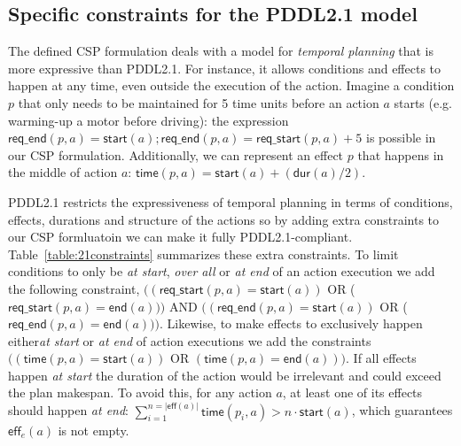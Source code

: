 \documentclass{ecai}
\newcommand{\eff}{\mathsf{eff}}    %
\newcommand{\dur}{\mathsf{dur}}    %
\newcommand{\start}{\mathsf{start}}%
\newcommand{\en}{\mathsf{end}}     %
\newcommand{\tim}{\mathsf{time}}   %
\newcommand{\reqs}{\mathsf{req\_{start}}} %
\newcommand{\reqe}{\mathsf{req\_{end}}}   %
\begin{document}
\subsection{Specific constraints for the PDDL2.1 model}
\label{sec:PDDL21constraints}
The defined CSP formulation deals with a model for {\em temporal planning} that is more expressive than PDDL2.1. For instance, it allows conditions and effects to happen at any time, even outside the execution of the action. Imagine a condition $p$ that only needs to be maintained for 5 time units before an action $a$ starts (e.g. warming-up a motor before driving): the expression $\reqe(p,a)=\start(a); \reqe(p,a) = \reqs(p,a)+5$ is possible in our CSP formulation. Additionally, we can represent an effect $p$ that happens in the middle of action $a$: $\tim(p,a) = \start(a)+ (\dur(a) / 2)$.

PDDL2.1 restricts the expressiveness of temporal planning in terms of conditions, effects, durations and structure of the actions so by adding extra constraints to our CSP formluatoin we can make it fully PDDL2.1-compliant. Table~\ref{table:21constraints} summarizes these extra constraints. To limit conditions to only be \emph{at start}, \emph{over all} or \emph{at end} of an action execution we add the following constraint, $((\reqs(p,a) = \start(a))$ OR ($\reqs(p,a) = \en(a)))$ AND $((\reqe(p,a) = \start(a))$ OR ($\reqe(p,a) = \en(a)))$. Likewise, to make effects to exclusively happen either\emph{at start} or \emph{at end} of action executions we add the constraints $((\tim(p,a) = \start(a))$ OR $(\tim(p,a) = \en(a)))$. If all effects happen \emph{at start} the duration of the action would be irrelevant and could exceed the plan makespan. To avoid this, for any action $a$, at least one of its effects should happen \emph{at end}: $\sum_{i=1}^{n =|\eff(a)|} \tim(p_i,a) > n \cdot \start(a)$, which guarantees $\eff_e(a)$ is not empty.
\end{document}
